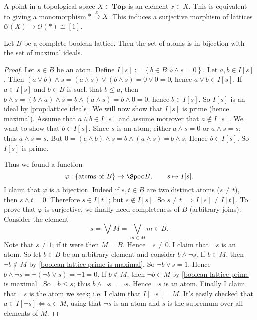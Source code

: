 A point in a topological space $X \in \mathbf{Top}$ is an element $x \in X$. This is equivalent to giving a monomorphism $* \xrightarrow{x} X$. This induces a surjective morphism of lattices $\mathcal{O}(X) \to \mathcal{O}(*) \cong [1]$.

\begin{theorem}
\label{boolean atoms are in bijection with maximal ideals}
Let $B$ be a complete boolean lattice. Then the set of atoms is in bijection with the set of maximal ideals.
\end{theorem}
\begin{proof}
Let $s \in B$ be an atom. 
Define $I[s] := \left\{ b \in B : b \wedge s = 0 \right\}$. 
Let $a,b \in I[s]$. 
Then $(a \vee b) \wedge s = (a \wedge s) \vee (b \wedge s) = 0 \vee 0 = 0$, hence $a \vee b \in I[s]$. 
If $a \in I[s]$ and $b \in B$ is such that $b \leq a$, then $b \wedge s = (b \wedge a) \wedge s = b \wedge (a \wedge s) = b \wedge 0 = 0$, hence $b \in I[s]$. 
So $I[s]$ is an ideal by \cref{prop:lattice ideals}. We will now show that $I[s]$ is prime (hence maximal). Assume that $a \wedge b \in I[s]$ and assume moreover that $a \not\in I[s]$. We want to show that $b \in I[s]$. Since $s$ is an atom, either $a \wedge s = 0$ or $a \wedge s = s$; thus $a \wedge s = s$. But $0 = (a \wedge b) \wedge s = b \wedge (a \wedge s) = b \wedge s$. Hence $b \in I[s]$. So $I[s]$ is prime.

Thus we found a function
\[ \varphi : \left\{\text{atoms of } B \right\} \to \Spec B, \qquad s \mapsto I[s]. \]
I claim that $\varphi$ is a bijection. Indeed if $s,t \in B$ are two distinct atoms ($s \neq t$), then $s \wedge t = 0$. Therefore $s \in I[t]$; but $s \not\in I[s]$. So $s \neq t \implies I[s] \neq I[t]$. To prove that $\varphi$ is surjective, we finally need completeness of $B$ (arbitrary joins). Consider the element
\[ s = \bigvee M = \bigvee_{m \in M} m \in B. \]
Note that $s \neq 1$; if it were then $M = B$. 
Hence $\neg s \neq 0$. I claim that $\neg s$ is an atom. 
So let $b \in B$ be an arbitrary element and consider $b \wedge \neg s$. 
If $b \in M$, then $\neg b \not\in M$ by \cref{boolean lattice prime is maximal}. 
So $\neg b \vee s = 1$. Hence $b \wedge \neg s = \neg (\neg b \vee s) = \neg 1 = 0$. 
If $b \not\in M$, then $\neg b \in M$ by \cref{boolean lattice prime is maximal}. 
So $\neg b \leq s$; thus $b \wedge \neg s = \neg s$. Hence $\neg s$ is an atom. Finally I claim that $\neg s$ is the atom we seek; i.e. I claim that $I[\neg s] = M$. It's easily checked that $a \in I[\neg s] \iff a \in M$, using that $\neg s$ is an atom and $s$ is the supremum over all elements of $M$.
\end{proof}

